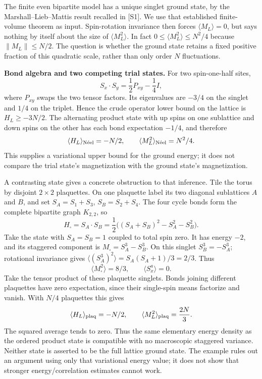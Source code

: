 \documentclass[11pt]{article}
\begin{document}
The finite even bipartite model has a unique singlet ground state, by the
Marshall--Lieb--Mattis result recalled in [S1].  We use that established
finite-volume theorem as input.  Spin-rotation invariance then forces
$\langle M_L\rangle=0$, but says nothing by itself about the size of
$\langle M_L^2\rangle$.  In fact $0\leq\langle M_L^2\rangle\leq N^2/4$
because $\|M_L\|\leq N/2$.  The question is whether the ground state retains
a fixed positive fraction of this quadratic scale, rather than only order
$N$ fluctuations.

\textbf{Bond algebra and two competing trial states.}
For two spin-one-half sites,
\[
 S_x\cdot S_y=\frac12 P_{xy}-\frac14 I,
\]
where $P_{xy}$ swaps the two tensor factors.  Its eigenvalues are $-3/4$
on the singlet and $1/4$ on the triplet.  Hence the crude operator lower
bound on the lattice is $H_L\geq-3N/2$.  The alternating product state with
up spins on one sublattice and down spins on the other has each bond
expectation $-1/4$, and therefore
\[
 \langle H_L\rangle_{\rm N\acute eel}=-N/2,
 \qquad \langle M_L^2\rangle_{\rm N\acute eel}=N^2/4.
\]
This supplies a variational upper bound for the ground energy; it does not
compare the trial state's magnetization with the ground state's magnetization.

A contrasting state gives a concrete obstruction to that inference.  Tile
the torus by disjoint $2\times2$ plaquettes.  On one plaquette label its two
diagonal sublattices $A$ and $B$, and set $S_A=S_1+S_3$,
$S_B=S_2+S_4$.  The four cycle bonds form the complete bipartite graph
$K_{2,2}$, so
\[
 H_\square=S_A\cdot S_B
 =\frac12\bigl((S_A+S_B)^2-S_A^2-S_B^2\bigr).
\]
Take the state with $S_A=S_B=1$ coupled to total spin zero.  It has energy
$-2$, and its staggered component is $M_\square=S_A^3-S_B^3$.
On this singlet $S_B^3=-S_A^3$; rotational invariance gives
$\langle(S_A^3)^2\rangle=S_A(S_A+1)/3=2/3$.  Thus
\[
 \langle M_\square^2\rangle=8/3,
 \qquad\langle S_x^a\rangle=0.
\]
Take the tensor product of these plaquette singlets.  Bonds joining different
plaquettes have zero expectation, since their single-spin means factorize
and vanish.  With $N/4$ plaquettes this gives
\[
 \langle H_L\rangle_{\rm plaq}=-N/2,
 \qquad\langle M_L^2\rangle_{\rm plaq}=\frac{2N}{3}.
\]
The squared average tends to zero.  Thus the same elementary energy density
as the ordered product state is compatible with no macroscopic staggered
variance.  Neither state is asserted to be the full lattice ground state.
The example rules out an argument using only that variational energy value;
it does not show that stronger energy/correlation estimates cannot work.
\end{document}
